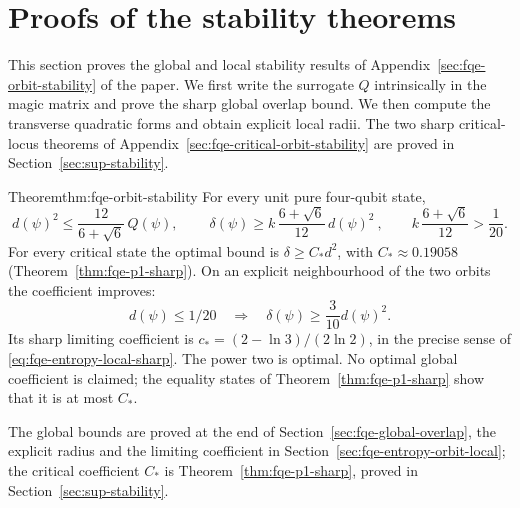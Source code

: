 \section{Proofs of the stability theorems}\label{sec:fqe-stability-proofs}
This section proves the global and local stability results of Appendix~\ref{sec:fqe-orbit-stability} of the paper.
We first write the surrogate $Q$ intrinsically in the magic matrix and prove the sharp global overlap bound. We then compute
the transverse quadratic forms and obtain explicit local radii. The
two sharp critical-locus theorems of Appendix~\ref{sec:fqe-critical-orbit-stability} are proved in Section~\ref{sec:sup-stability}.

\begin{restated}{Theorem}{thm:fqe-orbit-stability}
For every unit pure four-qubit state,
\[
 d(\psi)^2\le\frac{12}{6+\sqrt6}\,Q(\psi),\qquad
 \boxed{\ \delta(\psi)\ge k\,\frac{6+\sqrt6}{12}\,d(\psi)^2\ },\qquad k\,\frac{6+\sqrt6}{12}>\frac1{20}.
\]
For every critical state the optimal bound is $\delta\ge C_*d^2$, with
$C_*\approx0.19058$ (Theorem~\ref{thm:fqe-p1-sharp}).
On an explicit neighbourhood of the two orbits the coefficient improves:
\[
 d(\psi)\le1/20\quad\Longrightarrow\quad
 \delta(\psi)\ge\frac3{10}d(\psi)^2.
\]
Its sharp limiting coefficient is
$c_*=(2-\ln3)/(2\ln2)$, in the precise sense of
\eqref{eq:fqe-entropy-local-sharp}. The power two is optimal.
No optimal global coefficient is claimed; the equality states of
Theorem~\ref{thm:fqe-p1-sharp} show that it is at most $C_*$.
\end{restated}
\noindent The global bounds are proved at the end of Section~\ref{sec:fqe-global-overlap}, the explicit radius and the
limiting coefficient in Section~\ref{sec:fqe-entropy-orbit-local}; the critical coefficient $C_*$ is
Theorem~\ref{thm:fqe-p1-sharp}, proved in Section~\ref{sec:sup-stability}.




